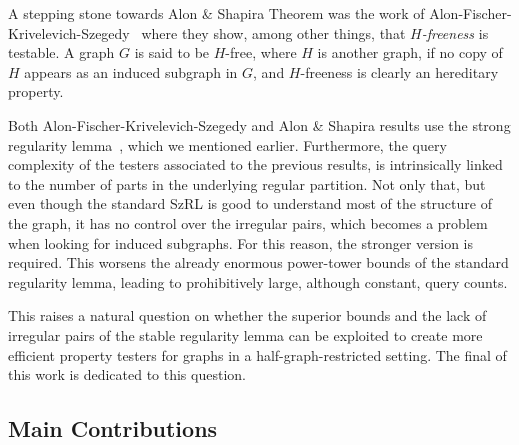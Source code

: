         A stepping stone towards Alon \& Shapira Theorem was the work of
        Alon-Fischer-Krivelevich-Szegedy~\cite{efficient_testing_of_large_graphs} where they show, among other things,
        that \emph{$H$-freeness} is testable.
        A graph $G$ is said to be $H$-free, where $H$ is another graph, if no copy of $H$ appears as an induced subgraph in
        $G$, and $H$-freeness is clearly an hereditary property.

        Both Alon-Fischer-Krivelevich-Szegedy and Alon \& Shapira results use the strong regularity
        lemma~\cite[Lemma 4.1]{efficient_testing_of_large_graphs}, which we mentioned earlier.
        Furthermore, the query complexity of the testers associated to the previous results, is intrinsically linked to the number of
        parts in the underlying regular partition.
        Not only that, but even though the standard SzRL is good to understand most of the structure of the graph,
        it has no control over the irregular pairs, which becomes a problem when looking for induced subgraphs.
        For this reason, the stronger version is required.
        This worsens the already enormous power-tower bounds of the standard regularity lemma, leading to prohibitively large,
        although constant, query counts.

        This raises a natural question on whether the superior bounds and the lack of irregular pairs of the stable regularity
        lemma can be exploited to create more efficient property testers for graphs in a half-graph-restricted setting.
        The final of this work is dedicated to this question.

    \subsection{Main Contributions} \label{subsec:main_contributions}

